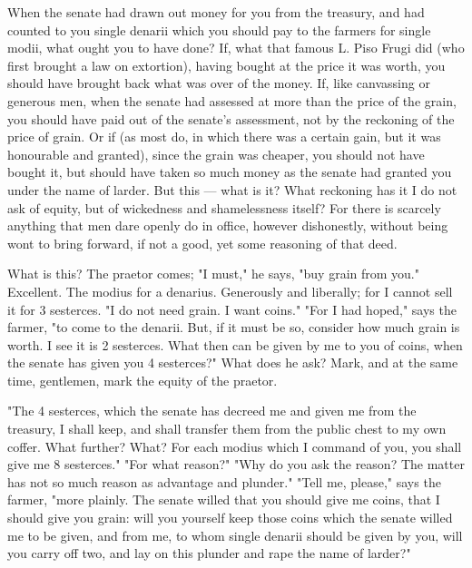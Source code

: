  When the senate had drawn out money for you from the treasury, and had counted to you single denarii which you should pay to the farmers for single modii, what ought you to have done? If, what that famous L. Piso Frugi did (who first brought a law on extortion), having bought at the price it was worth, you should have brought back what was over of the money. If, like canvassing or generous men, when the senate had assessed at more than the price of the grain, you should have paid out of the senate's assessment, not by the reckoning of the price of grain. Or if (as most do, in which there was a certain gain, but it was honourable and granted), since the grain was cheaper, you should not have bought it, but should have taken so much money as the senate had granted you under the name of larder. But this --- what is it? What reckoning has it I do not ask of equity, but of wickedness and shamelessness itself? For there is scarcely anything that men dare openly do in office, however dishonestly, without being wont to bring forward, if not a good, yet some reasoning of that deed.

 What is this? The praetor comes; "I must," he says, "buy grain from you." Excellent. The modius for a denarius. Generously and liberally; for I cannot sell it for 3 sesterces. "I do not need grain. I want coins." "For I had hoped," says the farmer, "to come to the denarii. But, if it must be so, consider how much grain is worth. I see it is 2 sesterces. What then can be given by me to you of coins, when the senate has given you 4 sesterces?" What does he ask? Mark, and at the same time, gentlemen, mark the equity of the praetor.

 "The 4 sesterces, which the senate has decreed me and given me from the treasury, I shall keep, and shall transfer them from the public chest to my own coffer. What further? What? For each modius which I command of you, you shall give me 8 sesterces." "For what reason?" "Why do you ask the reason? The matter has not so much reason as advantage and plunder." "Tell me, please," says the farmer, "more plainly. The senate willed that you should give me coins, that I should give you grain: will you yourself keep those coins which the senate willed me to be given, and from me, to whom single denarii should be given by you, will you carry off two, and lay on this plunder and rape the name of larder?"

